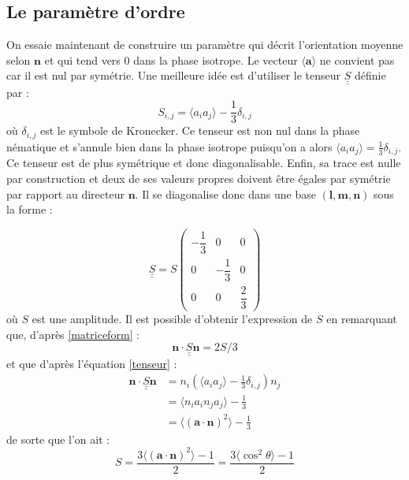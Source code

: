 \documentclass[11pt,a4paper]{article}
\numberwithin{equation}{section}
\begin{document}
\subsection{Le paramètre d'ordre}
On essaie maintenant de construire un paramètre qui décrit l'orientation moyenne selon $\bm{n}$ et qui tend vers 0 dans la phase isotrope. Le vecteur $\langle \bm{a} \rangle $ ne convient pas car il est nul par symétrie. Une meilleure idée est d'utiliser le tenseur $\underline{\underline{S}}$ définie par :
\begin{equation}
S_{i,j} = \langle a_i a_j \rangle -\frac{1}{3} \delta_{i,j}
\label{tenseur}
\end{equation}
où $\delta_{i,j}$ est le symbole de Kronecker. Ce tenseur est non nul dans la phase nématique et s'annule bien dans la phase isotrope puisqu'on a alors $\langle  a_i a_j \rangle  = \frac{1}{3} \delta_{i,j}$. Ce tenseur est de plus symétrique et donc diagonalisable. Enfin, sa trace est nulle par construction et deux de ses valeurs propres doivent être égales par symétrie par rapport au directeur $\bm{n}$. Il se diagonalise donc dans une base $(\bm{l}, \bm{m}, \bm{n})$ sous la forme :

\begin{equation}
\underline{\underline{S}} = S
\begin{pmatrix}
 -\dfrac{1}{3} & 0  & 0\\
 0 & -\dfrac{1}{3} &0 \\
 0 &0 & \dfrac{2}{3}
 \end{pmatrix} 
 \label{matriceform}
\end{equation}
où $S$ est une amplitude. Il est possible d'obtenir l'expression de $S$ en remarquant que, d'après \ref{matriceform} :
\begin{equation*}
 \bm{n} \cdot \underline{\underline{S}} \bm{n} = 2S/3
\end{equation*} 
et que d'après l'équation \ref{tenseur} :
\begin{align*}
 \bm{n} \cdot \underline{\underline{S}} \bm{n} & = n_i\left(\langle a_i a_j \rangle-\frac{1}{3} \delta_{i,j} \right )n_j\\ 
 & = \langle n_ia_in_ja_j \rangle -\frac{1}{3}\\
 & = \langle (\bm{a}\cdot \bm{n})^2 \rangle - \frac{1}{3}
\end{align*}
de sorte que l'on ait :
\begin{equation}
S = \frac{3 \langle (\bm{a}\cdot \bm{n})^2\rangle -1}{2} = \frac{3 \langle \cos^2 \theta \rangle -1}{2}
\end{equation}
\end{document}
